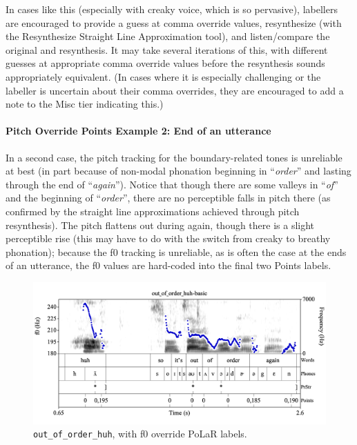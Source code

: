 \documentclass[11pt, twoside]{memoir}
\def\langtext#1{\textit{#1}}
\begin{document}
In cases like this (especially with creaky voice, which is so pervasive), labellers are encouraged to provide a guess at comma override values, resynthesize (with the Resynthesize Straight Line Approximation tool), and listen\slash compare the original and resynthesis. It may take several iterations of this, with different guesses at appropriate comma override values before the resynthesis sounds appropriately equivalent. (In cases where it is especially challenging or the labeller is uncertain about their comma overrides, they are encouraged to add a note to the Misc tier indicating this.) 

\paragraph{Pitch Override Points Example 2: End of an utterance\label{pitch-override-points-example-2}}

In a second case, the pitch tracking for the boundary-related tones is unreliable at best (in part because of non-modal phonation beginning in “\langtext{order}” and lasting through the end of “\langtext{again}”). Notice that though there are some valleys in “\langtext{of}” and the beginning of “\langtext{order}”, there are no perceptible falls in pitch there (as confirmed by the straight line approximations achieved through pitch resynthesis). The pitch flattens out during again, though there is a slight perceptible rise (this may have to do with the switch from creaky to breathy phonation); because the f0 tracking is unreliable, as is often the case at the ends of an utterance, the f0 values are hard-coded into the final two Points labels.

\begin{figure}[H]
\centering
%
\includegraphics[width=.875\linewidth]{Points-out_of_order_huh-basic-comma.png}
%
\caption{\texttt{out\_of\_order\_huh}, with f0 override PoLaR labels.%
\label{fig:out_of_order_huh Points comma}%
%
}
\end{figure}
\end{document}
